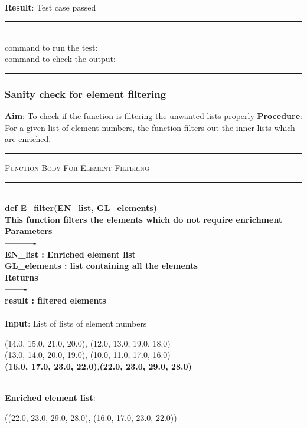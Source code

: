 \documentclass[fleqn, 12.5pt,a4paper]{report}
\begin{document}
\\
\textbf{Result}: Test case passed
\\
{\rule{\linewidth}{0.02cm}}\\
command to run the test: {\selectfont {}}\\
command to check the output: {\selectfont {}}\\
{\rule{\linewidth}{0.02cm}}
\subsubsection{Sanity check for element filtering}
\textbf{Aim}: To check if the function is filtering the unwanted lists properly \newline
\textbf{Procedure}: For a given list of element numbers, the function filters out the inner lists which are enriched.
{ \rule{\linewidth}{0.05cm}}
	{\scshape Function Body For Element Filtering}\\
{ \rule{\linewidth}{0.05cm}}
{\selectfont
\\
\textbf{def E{\_}filter(EN{\_}list, GL{\_}elements)\\
    This function filters the elements which do not require enrichment\\
    Parameters\\
    ----------\\
    EN{\_}list : Enriched element list\\
    GL{\_}elements :  list containing all the elements\\
    Returns\\
    -------\\
    result : filtered elements\\
    }}\\
\textbf{Input}: List of lists of element numbers
\begin{center}
(14.0, 15.0, 21.0, 20.0), (12.0, 13.0, 19.0, 18.0)\\
(13.0, 14.0, 20.0, 19.0), (10.0, 11.0, 17.0, 16.0)\\
\textbf{(16.0, 17.0, 23.0, 22.0)},\textbf{(22.0, 23.0, 29.0, 28.0)} \\
\end{center}
\\
\textbf{Enriched element list}:
\begin{center}
((22.0, 23.0, 29.0, 28.0), (16.0, 17.0, 23.0, 22.0))
\end{center}
\end{document}
